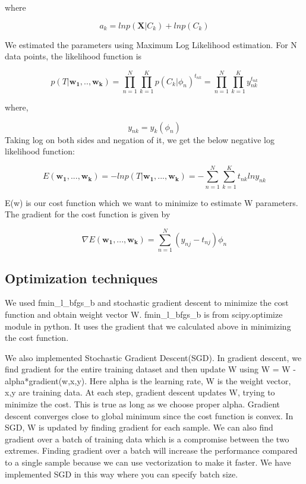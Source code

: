 \documentclass{article}
\begin{document}
where 

\begin{equation*}
a_{k} = ln p(\boldsymbol{X}|C_{k}) + ln  p(C_{k})
\end{equation*}

We estimated the parameters using Maximum Log Likelihood
estimation. For N data points, the likelihood function is

\begin{equation*}
p(T|\boldsymbol{w_{1},..,w_{k}}) = \prod\limits_{n=1}^N \prod\limits_{k=1}^K p(C_{k}|\phi_{n})^{t_{nk}} = \prod\limits_{n=1}^N \prod\limits_{k=1}^K y_{nk}^{t_{nk}}
\end{equation*}

where,

\begin{equation*}
y_{nk} = y_k(\phi_{n})
\end{equation*}
Taking log on both sides
and negation of it, we get the below negative log likelihood
function:

\begin{equation*}
E (\boldsymbol{w_{1}},..., \boldsymbol{w_{k}} ) = -ln p(T|\boldsymbol{w_{1}},...,\boldsymbol{w_{k}}) = - \sum\limits_{n=1}^N \sum\limits_{k=1}^K t_{nk} ln y_{nk}
\end{equation*}

E(w) is our cost
function which we want to minimize to estimate W parameters.
The gradient for the cost function is given by


\begin{equation*}
\nabla E (\boldsymbol{w_{1}},..., \boldsymbol{w_{k}} ) = \sum\limits_{n=1}^N(y_{nj} - t_{nj}) \phi_{n}
\end{equation*}





\subsection{Optimization techniques}
We used fmin\_l\_bfgs\_b and stochastic gradient descent to minimize the cost function and obtain weight vector W. fmin\_l\_bfgs\_b is from scipy.optimize module in python. It uses the gradient that we calculated above in minimizing the cost function.

We also implemented Stochastic Gradient Descent(SGD). In gradient descent, we find gradient for the entire training dataset and then update W using W = W - alpha*gradient(w,x,y). Here alpha is the learning rate, W is the weight vector, x,y are training data. At each step, gradient descent updates W, trying to minimize the cost. This is true as long as we choose proper alpha. Gradient descent converges close to global minimum since the cost function is convex. In SGD, W is updated by finding gradient for each sample. We can also find gradient over a batch of training data which is a compromise between the two extremes. Finding gradient over a batch will increase the performance compared to a single sample because we can use vectorization to make it faster. We have implemented SGD in this way where you can specify batch size.
\end{document}
